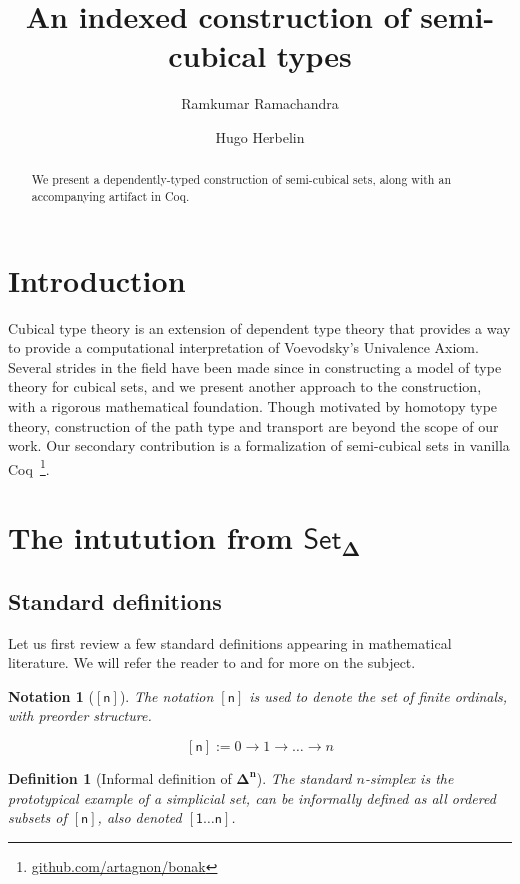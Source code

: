 \documentclass[10pt, titlepage]{amsart}
\title{An indexed construction of semi-cubical types}
\author{Ramkumar Ramachandra}
\author{Hugo Herbelin}
\newtheorem{notation}{Notation}
\newtheorem{definition}{Definition}
\newcommand{\Simplex}[1]{\ensuremath{\boldsymbol{\Delta^{#1}}}}
\newcommand{\SSet}{\ensuremath{\mathsf{Set}_{\boldsymbol{\Delta}}}}
\newcommand{\sq}[1]{\ensuremath{\mathsf{[#1]}}}
\newcommand{\sqsn}{\ensuremath{\mathsf{[1 \ldots n]}}}
\begin{document}
\begin{abstract}
  We present a dependently-typed construction of semi-cubical sets, along with an accompanying artifact in Coq.
\end{abstract}
\maketitle
\tableofcontents

\section{Introduction}

Cubical type theory is an extension of dependent type theory that provides a way to provide a computational interpretation of Voevodsky's Univalence Axiom. Several strides in the field have been made since \cite{Bezem14} in constructing a model of type theory for cubical sets, and we present another approach to the construction, with a rigorous mathematical foundation. Though motivated by homotopy type theory, construction of the path type and transport are beyond the scope of our work. Our secondary contribution is a formalization of semi-cubical sets in vanilla Coq~\footnote{\href{https://github.com/artagnon/bonak}{github.com/artagnon/bonak}}.

\section{The intutution from \texorpdfstring{\SSet}{simplicial sets}}
\subsection{Standard definitions}

Let us first review a few standard definitions appearing in mathematical literature. We will refer the reader to \cite{Friedman08} and \cite{Riehl11} for more on the subject.

\begin{notation}[\sq{n}]
  The notation \sq{n} is used to denote the set of finite ordinals, with preorder structure.

  \begin{equation*}
    \sq{n} := 0 \rightarrow 1 \rightarrow \ldots \rightarrow n
  \end{equation*}
\end{notation}

\begin{definition}[Informal definition of \Simplex{n}]
  The standard $n$-simplex is the prototypical example of a simplicial set,  can be informally defined as all ordered subsets of \sq{n}, also denoted \sqsn.
\end{definition}
\end{document}
